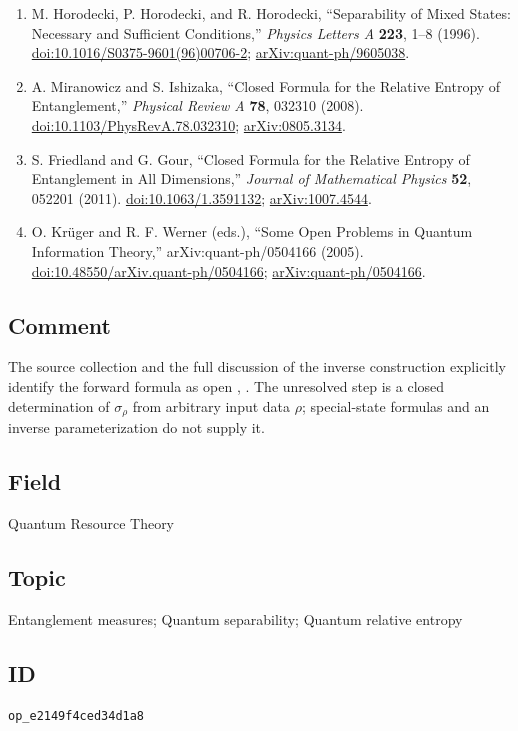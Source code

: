 \begin{enumerate}[label={},leftmargin=4.8em,labelsep=0.5em]
  \footnotesize
  \item[\textup{[HHH96]}]\label{ref:p12-horodecki}
  M. Horodecki, P. Horodecki, and R. Horodecki,
  ``Separability of Mixed States: Necessary and Sufficient Conditions,''
  \emph{Physics Letters A} \textbf{223}, 1--8 (1996).
  \href{https://doi.org/10.1016/S0375-9601(96)00706-2}{doi:10.1016/S0375-9601(96)00706-2};
  \href{https://arxiv.org/abs/quant-ph/9605038}{arXiv:quant-ph/9605038}.

  \item[\textup{[MI08]}]\label{ref:p12-miranowicz-ishizaka}
  A. Miranowicz and S. Ishizaka,
  ``Closed Formula for the Relative Entropy of Entanglement,''
  \emph{Physical Review A} \textbf{78}, 032310 (2008).
  \href{https://doi.org/10.1103/PhysRevA.78.032310}{doi:10.1103/PhysRevA.78.032310};
  \href{https://arxiv.org/abs/0805.3134}{arXiv:0805.3134}.

  \item[\textup{[FG11]}]\label{ref:p12-friedland-gour}
  S. Friedland and G. Gour,
  ``Closed Formula for the Relative Entropy of Entanglement in All
  Dimensions,''
  \emph{Journal of Mathematical Physics} \textbf{52}, 052201 (2011).
  \href{https://doi.org/10.1063/1.3591132}{doi:10.1063/1.3591132};
  \href{https://arxiv.org/abs/1007.4544}{arXiv:1007.4544}.

  \item[\textup{[KW05]}]\label{ref:p12-krueger-werner}
  O. Krüger and R. F. Werner (eds.),
  ``Some Open Problems in Quantum Information Theory,''
  arXiv:quant-ph/0504166 (2005).
  \href{https://doi.org/10.48550/arXiv.quant-ph/0504166}{doi:10.48550/arXiv.quant-ph/0504166};
  \href{https://arxiv.org/abs/quant-ph/0504166}{arXiv:quant-ph/0504166}.
\end{enumerate}

\subsection*{Comment}

The source collection and the full discussion of the inverse construction
explicitly identify the forward formula as open
,
.  The unresolved step is a
closed determination of $\sigma_\rho$ from arbitrary input data $\rho$;
special-state formulas and an inverse parameterization do not supply it.

\subsection*{Field}

Quantum Resource Theory

\subsection*{Topic}

Entanglement measures; Quantum separability; Quantum relative entropy

\subsection*{ID}

\texttt{op\_e2149f4ced34d1a8}
